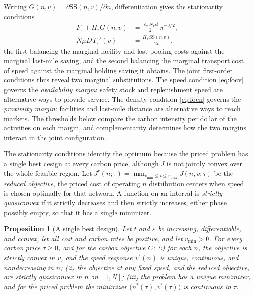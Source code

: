 \documentclass[11pt]{article}
\newtheorem{proposition}{Proposition}
\theoremstyle{definition}
\theoremstyle{remark}
\theoremstyle{plain}
\newcommand{\sstock}{\mathrm{SS}}
\begin{document}
Writing $G(n,v)=\partial\sstock(n,v)/\partial n$, differentiation gives the stationarity conditions
\begin{align}
  F_\tau + H_\tau G(n,v) &= \frac{\ell_\tau N\mu\delta}{2}\,n^{-3/2}, \label{eq:focn}\\[2pt]
  N\mu D\,T_\tau'(v) &= \frac{H_\tau\,\sstock(n,v)}{2v}, \label{eq:focv}
\end{align}
the first balancing the marginal facility and lost-pooling costs against the marginal last-mile saving, and
the second balancing the marginal transport cost of speed against the marginal holding saving it obtains.
The joint first-order conditions thus reveal two marginal substitutions. The speed condition
\eqref{eq:focv} governs the \emph{availability margin}: safety stock and replenishment speed are
alternative ways to provide service. The density condition \eqref{eq:focn} governs the \emph{proximity
margin}: facilities and last-mile distance are alternative ways to reach markets. The thresholds below
compare the carbon intensity per dollar of the activities on each margin, and complementarity determines how
the two margins interact in the joint configuration.

The stationarity conditions identify the optimum because the priced problem has a single best design at every
carbon price, although $J$ is not jointly convex over the whole feasible region. Let
$J^{\mathrm r}(n;\tau)=\min_{v_{\min}\le v\le v_{\max}}J(n,v;\tau)$ be the \emph{reduced objective}, the
priced cost of operating $n$ distribution centers when speed is chosen optimally for that network. A function
on an interval is \emph{strictly quasiconvex} if it strictly decreases and then strictly increases, either
phase possibly empty, so that it has a single minimizer.

\begin{proposition}[A single best design]\label{prop:unique}
Let $t$ and $\varepsilon$ be increasing, differentiable, and convex, let all cost and carbon rates be
positive, and let $v_{\min}>0$. For every carbon price $\tau\ge0$, and for the carbon objective $C$:
\textup{(i)} for each $n$, the objective is strictly convex in $v$, and the speed response $v^*(n)$ is unique,
continuous, and nondecreasing in $n$;
\textup{(ii)} the objective at any fixed speed, and the reduced objective, are strictly quasiconvex in $n$ on
$[1,N]$;
\textup{(iii)} the problem has a unique minimizer, and for the priced problem the minimizer
$\big(n^*(\tau),v^*(\tau)\big)$ is continuous in $\tau$.
\end{proposition}
\end{document}
